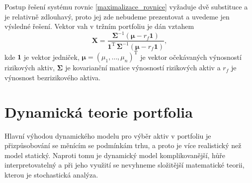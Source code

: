 \documentclass[a4paper,12pt]{report}
\theoremstyle{definition} \newtheorem{definice}[veta]{Definice}
\theoremstyle{remark}
\begin{document}
Postup řešení systému rovnic \eqref{maximalizace_rovnice} vyžaduje dvě substituce a je relativně zdlouhavý, proto jej zde nebudeme prezentovat a uvedeme jen výsledné řešení.
Vektor vah v tržním portfoliu  je dán vztahem
\begin{equation} \label{vahy_trzni}
\boldsymbol{X}=\frac{\boldsymbol{\Sigma}^{-1}\left(\boldsymbol{\mu}-r_f\boldsymbol{1}\right)}{\boldsymbol{1}^\mathrm{T}\,\boldsymbol{\Sigma}^{-1}\left(\boldsymbol{\mu}-r_f\boldsymbol{1}\right)},
\end{equation}
kde $\boldsymbol{1}$ je vektor jedniček, $\boldsymbol{\mu}=(\mu_1,\dots,\mu_n)^\mathrm{T}$ je vektor očekávaných výnosností rizikových aktiv, $\boldsymbol{\Sigma}$ je kovarianční matice výnosností rizikových aktiv a $r_f$ je výnosnost bezrizikového aktiva.



\section{Dynamická teorie portfolia}
Hlavní výhodou dynamického modelu pro výběr aktiv v portfoliu je přizpůsobování se měnícím se podmínkám trhu, a proto je více realistický než model statický.
Naproti tomu je dynamický model komplikovanější, hůře interpretovatelný a při jeho využití se nevyhneme složitější matematické teorii, kterou je stochastická analýza.
\end{document}
